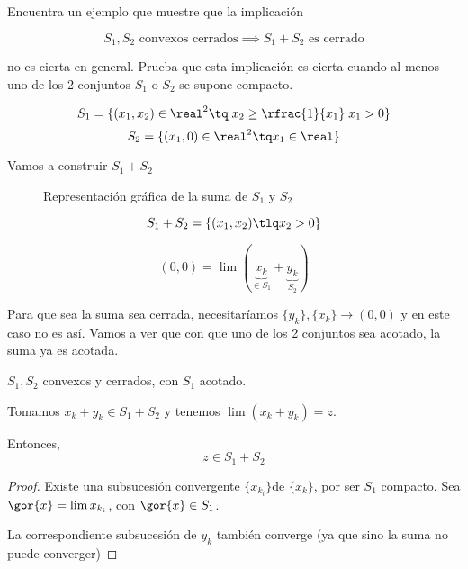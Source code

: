 \begin{problem}[9]

Encuentra un ejemplo que muestre que la implicación

\[S_1,S_2 \text{ convexos cerrados} \implies S_1+S_2\text{ es cerrado}\]

no es cierta en general. Prueba que esta implicación es cierta cuando al menos uno de los 2 conjuntos $S_1$ o $S_2$ se supone compacto.

\solution

\[S_1 = \{ (x_1,x_2) \in \real^2\tq\; x_2\geq \rfrac{1}{x_1} \;x_1 > 0\}\]
\[S_2 = \{(x_1,0) \in \real^2\tq x_1\in\real\}\]

Vamos a construir $S_1 + S_2$


\begin{figure}[hbtp]
\centering
{}
\caption{Representación gráfica de la suma de $S_1$ y $S_2$}
\end{figure}


\[S_1 + S_2  = \{(x_1,x_2)\tlq x_2>0\}\]

\[(0,0) = \lim (\underbrace{x_k}_{\in S_1} + \underbrace{y_k}_{S_2})\]

Para que sea la suma sea cerrada, necesitaríamos $\{y_k\},\{x_k\} \to (0,0)$ y en este caso no es así. Vamos a ver que con que uno de los 2 conjuntos sea acotado, la suma ya es acotada.

\begin{prop}

$S_1,S_2$ convexos y cerrados, con $S_1$ acotado.

Tomamos $x_k + y_k \in S_1 + S_2$ y tenemos $\lim(x_k + y_k) = z$.

Entonces,
\[z\in S_1 + S_2\]
\end{prop}
\begin{proof}
Existe una subsucesión convergente $\{x_{k_i}\}$de $\{x_k\}$, por ser $S_1$ compacto.
Sea $\gor{x} = \lim x_{k_i}$, con $\gor{x}\in S_1$.

La correspondiente subsucesión de $y_k$ también converge (ya que sino la suma no puede converger)

\end{proof}

\end{problem}

